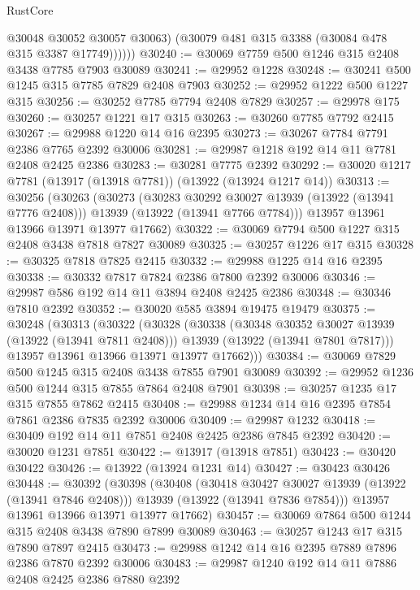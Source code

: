 \begin{lexlean}{RustCore}
\begin{coremodule}
              @30048
              @30052
              @30057
              @30063)
            (@30079 @481 @315 @3388 (@30084 @478 @315 @3387 @17749))))))
@30240 := @30069 @7759 @500 @1246 @315 @2408 @3438 @7785 @7903 @30089
@30241 := @29952 @1228
@30248 := @30241 @500 @1245 @315 @7785 @7829 @2408 @7903
@30252 := @29952 @1222 @500 @1227 @315
@30256 := @30252 @7785 @7794 @2408 @7829
@30257 := @29978 @175
@30260 := @30257 @1221 @17 @315
@30263 := @30260 @7785 @7792 @2415
@30267 := @29988 @1220 @14 @16 @2395
@30273 := @30267 @7784 @7791 @2386 @7765 @2392 @30006
@30281 := @29987 @1218 @192 @14 @11 @7781 @2408 @2425 @2386
@30283 := @30281 @7775 @2392
@30292 := @30020 @1217 @7781 (@13917 (@13918 @7781)) (@13922 (@13924 @1217 @14))
@30313 := @30256
    (@30263
      (@30273
        (@30283 @30292 @30027 @13939 (@13922 (@13941 @7776 @2408)))
        @13939
        (@13922 (@13941 @7766 @7784)))
      @13957
      @13961
      @13966
      @13971
      @13977
      @17662)
@30322 := @30069 @7794 @500 @1227 @315 @2408 @3438 @7818 @7827 @30089
@30325 := @30257 @1226 @17 @315
@30328 := @30325 @7818 @7825 @2415
@30332 := @29988 @1225 @14 @16 @2395
@30338 := @30332 @7817 @7824 @2386 @7800 @2392 @30006
@30346 := @29987 @586 @192 @14 @11 @3894 @2408 @2425 @2386
@30348 := @30346 @7810 @2392
@30352 := @30020 @585 @3894 @19475 @19479
@30375 := @30248
    (@30313
      (@30322
        (@30328
          (@30338
            (@30348 @30352 @30027 @13939 (@13922 (@13941 @7811 @2408)))
            @13939
            (@13922 (@13941 @7801 @7817)))
          @13957
          @13961
          @13966
          @13971
          @13977
          @17662)))
@30384 := @30069 @7829 @500 @1245 @315 @2408 @3438 @7855 @7901 @30089
@30392 := @29952 @1236 @500 @1244 @315 @7855 @7864 @2408 @7901
@30398 := @30257 @1235 @17 @315 @7855 @7862 @2415
@30408 := @29988 @1234 @14 @16 @2395 @7854 @7861 @2386 @7835 @2392 @30006
@30409 := @29987 @1232
@30418 := @30409 @192 @14 @11 @7851 @2408 @2425 @2386 @7845 @2392
@30420 := @30020 @1231 @7851
@30422 := @13917 (@13918 @7851)
@30423 := @30420 @30422
@30426 := @13922 (@13924 @1231 @14)
@30427 := @30423 @30426
@30448 := @30392
    (@30398
      (@30408
        (@30418 @30427 @30027 @13939 (@13922 (@13941 @7846 @2408)))
        @13939
        (@13922 (@13941 @7836 @7854)))
      @13957
      @13961
      @13966
      @13971
      @13977
      @17662)
@30457 := @30069 @7864 @500 @1244 @315 @2408 @3438 @7890 @7899 @30089
@30463 := @30257 @1243 @17 @315 @7890 @7897 @2415
@30473 := @29988 @1242 @14 @16 @2395 @7889 @7896 @2386 @7870 @2392 @30006
@30483 := @29987 @1240 @192 @14 @11 @7886 @2408 @2425 @2386 @7880 @2392

\end{coremodule}
\end{lexlean}
